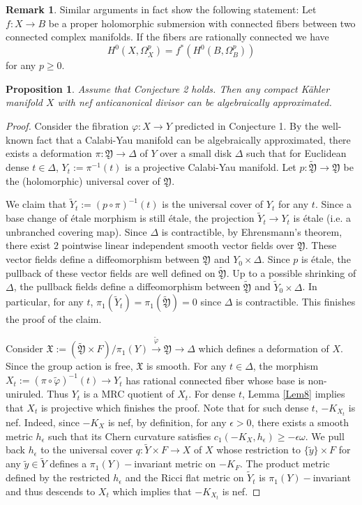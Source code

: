 \documentclass[a4, 12pt]{amsart}
\newtheorem{prop}[thm]{Proposition}
\numberwithin{equation}{section}
\theoremstyle{definition}
\newtheorem{rem}[thm]{Remark}
\begin{document}
\begin{rem}
Similar arguments in fact show the following statement:
Let $f:X\to B$ be a proper holomorphic submersion with connected fibers between two  connected complex manifolds. 
If the fibers are rationally connected we have
$$H^0(X,\Omega^p_X)=f^*(H^0(B,\Omega^p_B))$$ for any $p\geq 0$.
\end{rem}

\begin{prop}
\label{AlgApprox}
Assume that Conjecture 2 holds. Then any compact K\"ahler manifold $X$ with nef anticanonical divisor can be algebraically approximated.
\end{prop}
\begin{proof}
Consider the fibration $\varphi: X \to Y$ predicted in Conjecture 1.
By the well-known fact that a Calabi-Yau manifold can be algebraically approximated, there exists a deformation
$\pi: \mathfrak{Y} \to \Delta$ of $Y$ over a small disk $\Delta$ such that for Euclidean dense $t \in \Delta$, $Y_t := \pi^{-1}(t)$ is a projective Calabi-Yau manifold.
Let $p: \tilde{\mathfrak{Y}} \to \mathfrak{Y}$ be the (holomorphic) universal cover of $\mathfrak{Y}$.

We claim that $\tilde{Y}_t := (p \circ \pi)^{-1}(t)$ is the universal cover of $Y_t$ for any $t$.
Since a base change of \'etale morphism is still \'etale, the projection $\tilde{Y}_t \to Y_t$ is \'etale (i.e. a unbranched covering map).
Since $\Delta$ is contractible, by Ehrensmann's theorem,
there exist $2 $ pointwise linear independent smooth vector fields over $\mathfrak{Y}$.
These vector fields define a diffeomorphism between $\mathfrak{Y}$ and $Y_0 \times \Delta$.
Since $p$ is \'etale, the pullback of these vector fields are well defined on $\tilde{\mathfrak{Y}}$.
Up to a possible shrinking of $\Delta$, the pullback fields define a diffeomorphism between $\tilde{\mathfrak{Y}}$ and $\tilde{Y}_0 \times \Delta$.
In particular, for any $t$, $\pi_1(\tilde{Y}_t)=\pi_1(\tilde{\mathfrak{Y}})=0$ since $\Delta$ is contractible.
This finishes the proof of the claim.

Consider $ \mathfrak{X} := (\tilde{\mathfrak{Y}} \times F)/\pi_1(Y) \xrightarrow{\tilde{\varphi}} \mathfrak{Y} \to \Delta$ which defines a deformation of $X$.
Since the group action is free, $\mathfrak{X}$ is smooth.
For any $t \in \Delta$, the morphism $X_t:= (\pi \circ \tilde{\varphi})^{-1}(t) \to Y_t$ has rational connected fiber whose base is non-uniruled.
Thus $Y_t$ is a MRC quotient of $X_t$.
For dense $t$, Lemma \ref{Lem8} implies that $X_t$ is projective which finishes the proof.
Note that for such dense $t$, $-K_{X_t}$ is nef.
Indeed, since $-K_X$ is nef, by definition, for any $\epsilon >0$, there exists a smooth metric $h_\epsilon$ such that its Chern curvature satisfies $c_1(-K_X, h_\epsilon) \geq -\epsilon \omega$.
We pull back $h_\epsilon$ to the universal cover $q: \tilde{Y} \times F \to X$ of $X$ whose restriction to $\{ \tilde{y} \} \times F$ for any $\tilde{y} \in \tilde{Y}$ defines a $\pi_1(Y)-$invariant metric on $-K_F$.
The product metric defined by the restricted $h_\epsilon$ and the Ricci flat metric on $\tilde{Y}_t$ is $\pi_1(Y)-$invariant and thus descends to $X_t$ which implies that $-K_{X_t}$ is nef.
\end{proof}
\end{document}
